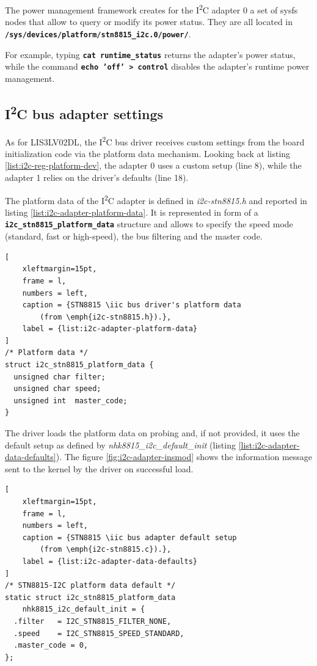 \documentclass[a4paper,10pt]{article}
\newcommand{\iic}{I\textsuperscript{2}C }
\newcommand{\keyword}[1]{\texttt{\textbf{#1}}}
\begin{document}
\begin{multicols}{2}
The power management framework creates for the \iic adapter 0 a set of sysfs
nodes that allow to query or modify its power status. They are all located in 
\keyword{/sys/devices/platform/stn8815\_i2c.0/power/}.

For example, typing \keyword{cat runtime\_status} returns the adapter's power
status, while the command \keyword{echo 'off' > control} disables the adapter's
runtime power management.


\subsection{\iic bus adapter settings}
\label{sec:adapter_settings}

As for LIS3LV02DL, the \iic bus driver receives custom settings from the board
initialization code via the platform data mechanism.
Looking back at listing \ref{list:i2c-reg-platform-dev}, the adapter 0 uses a
custom setup (line 8), while the adapter 1 relies on the driver's defaults
(line 18).

The platform data of the \iic adapter is defined in \emph{i2c-stn8815.h} and
reported in listing \ref{list:i2c-adapter-platform-data}.
It is represented in form of a \keyword{i2c\_stn8815\_platform\_data} structure
and allows to specify the speed mode (standard, fast or high-speed), 
the bus filtering and the master code.

\begin{lstlisting}[
	xleftmargin=15pt,
	frame = l,
	numbers = left,
	caption = {STN8815 \iic bus driver's platform data
		(from \emph{i2c-stn8815.h}).},
	label = {list:i2c-adapter-platform-data}
]
/* Platform data */
struct i2c_stn8815_platform_data {
  unsigned char filter;
  unsigned char speed;
  unsigned int  master_code;
}
\end{lstlisting}

The driver loads the platform data on probing and, if not provided, it uses the 
default setup as defined by \emph{nhk8815\_i2c\_default\_init} (listing 
\ref{list:i2c-adapter-data-defaults}).
The figure \ref{fig:i2c-adapter-insmod} shows the information message sent to
the kernel by the driver on successful load.

\begin{lstlisting}[
	xleftmargin=15pt,
	frame = l,
	numbers = left,
	caption = {STN8815 \iic bus adapter default setup
		(from \emph{i2c-stn8815.c}).},
	label = {list:i2c-adapter-data-defaults}
]
/* STN8815-I2C platform data default */
static struct i2c_stn8815_platform_data
	nhk8815_i2c_default_init = {
  .filter	= I2C_STN8815_FILTER_NONE,
  .speed	= I2C_STN8815_SPEED_STANDARD,
  .master_code = 0,
};
\end{lstlisting}


\end{multicols}
\end{document}
